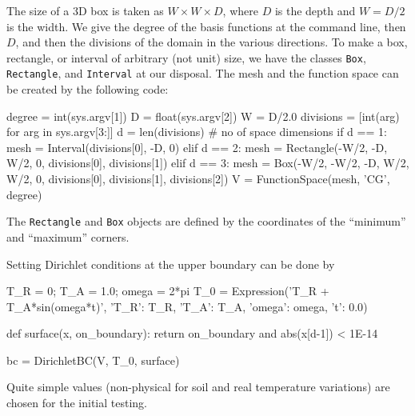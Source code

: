 The size of a 3D box is taken as $W\times W\times D$, where $D$ is
the depth and $W=D/2$ is the width.
We give the degree of the basis functions at the command line, then $D$,
and then the divisions of the domain in the various directions.
To make a box, rectangle, or interval of arbitrary (not unit) size,
we have the \dolfin{} classes {\fontsize{10pt}{10pt}\texttt{Box}}, {\fontsize{10pt}{10pt}\texttt{Rectangle}}, and
{\fontsize{10pt}{10pt}\texttt{Interval}} at our disposal. The mesh and the function space
can be created by the following code:
\begin{python}
degree = int(sys.argv[1])
D = float(sys.argv[2])
W = D/2.0
divisions = [int(arg) for arg in sys.argv[3:]]
d = len(divisions)  # no of space dimensions
if d == 1:
    mesh = Interval(divisions[0], -D, 0)
elif d == 2:
    mesh = Rectangle(-W/2, -D, W/2, 0, divisions[0], divisions[1])
elif d == 3:
    mesh = Box(-W/2, -W/2, -D, W/2, W/2, 0,
               divisions[0], divisions[1], divisions[2])
V = FunctionSpace(mesh, 'CG', degree)
\end{python}
The {\fontsize{10pt}{10pt}\texttt{Rectangle}} and {\fontsize{10pt}{10pt}\texttt{Box}} objects are defined by the coordinates
of the ``minimum'' and ``maximum'' corners.

Setting Dirichlet conditions at the upper boundary can be done by
\begin{python}
T_R = 0; T_A = 1.0; omega = 2*pi
T_0 = Expression('T_R + T_A*sin(omega*t)',
                 {'T_R': T_R, 'T_A': T_A, 'omega': omega, 't': 0.0})

def surface(x, on_boundary):
    return on_boundary and abs(x[d-1]) < 1E-14

bc = DirichletBC(V, T_0, surface)
\end{python}
Quite simple values (non-physical for soil and real temperature variations)
are chosen for the initial testing.

